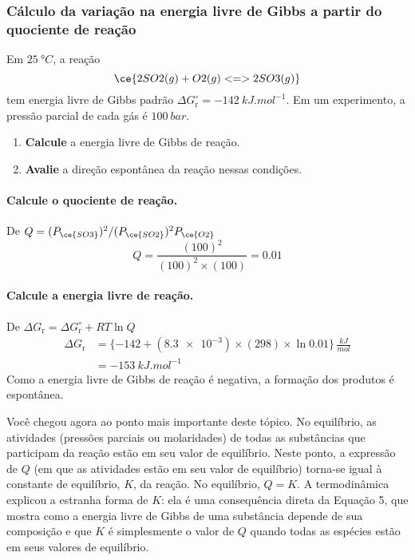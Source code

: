\begin{example}

\subsubsection{Cálculo da variação na energia livre de Gibbs a partir do quociente de reação}

Em \(\qty{25}{\unit{\degree C}}\), a reação \[
    \ce{ 2 SO2(g) + O2(g) <=> 2 SO3(g) }
\] tem energia livre de Gibbs padrão \(\Delta G_\mathrm{r}^\circ = \qty{-142}{\unit{kJ.mol^{-1}}}\). Em um experimento, a pressão parcial de cada gás
é \(\qty{100}{\unit{bar}}\).

\begin{enumerate}
\def\labelenumi{\alph{enumi}.}
\tightlist
\item
  \textbf{Calcule} a energia livre de Gibbs de reação.
\item
  \textbf{Avalie} a direção espontânea da reação nessas condições.
\end{enumerate}

\paragraph{Calcule o quociente de reação.}

De \(Q = (P_{\ce{SO3}})^2/(P_{\ce{SO2}})^2 P_{\ce{O2}}\) \[
    Q = \dfrac{ (\num{100})^2 }{ (\num{100})^2 \times (\num{100}) }
      = \num{0,01}
\]

\paragraph{Calcule a energia livre de reação.}

De \(\Delta G_\mathrm{r} = \Delta G_\mathrm{r}^\circ + RT \ln Q\) \[
\begin{aligned}
    \Delta G_\mathrm{r} &= 
        \Big\{ \num{-142} + (\num{8,3e-3}) \times (\num{298}) \times \ln \num{0,01} \Big\} \, \tfrac{\unit{kJ}}{\unit{mol}} \\
    &= \boxed{ \qty{-153}{\unit{kJ.mol^{-1}}} }
\end{aligned}
\] Como a energia livre de Gibbs de reação é negativa, a formação dos produtos é espontânea.

\end{example}

Você chegou agora ao ponto mais importante deste tópico. No equilíbrio, as atividades (pressões parciais ou molaridades) de todas as substâncias que
participam da reação estão em seu valor de equilíbrio. Neste ponto, a expressão de \(Q\) (em que as atividades estão em seu valor de equilíbrio)
torna-se igual à constante de equilíbrio, \(K\), da reação. No equilíbrio, \(Q = K\). A termodinâmica explicou a estranha forma de \(K\): ela é uma
consequência direta da Equação 5, que mostra como a energia livre de Gibbs de uma substância depende de sua composição e que \(K\) é simplesmente o
valor de \(Q\) quando todas as espécies estão em seus valores de equilíbrio.


